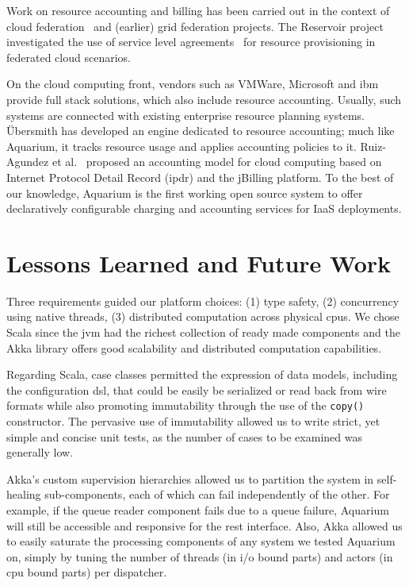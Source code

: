 \documentclass[letterpaper,twocolumn,10pt]{article}
\begin{document}
Work on resource accounting and billing has been carried out in the
context of cloud federation~\cite{Rochw09, Elmro09, Piro06} and
(earlier) grid federation projects. The Reservoir project investigated
the use of service level agreements~\cite{Elmro09} for resource
provisioning in federated cloud scenarios.  

On the cloud computing front, vendors such as VMWare, Microsoft and
{\sc ibm} provide full stack solutions, which also include resource
accounting. Usually, such systems are connected with existing
enterprise resource planning systems. \"Ubersmith has developed an
engine dedicated to resource accounting; much like Aquarium, it tracks
resource usage and applies accounting policies to it. Ruiz-Agundez et
al.~\cite{Ruiz-Agundez11} proposed an accounting model for cloud
computing based on Internet Protocol Detail Record ({\sc ipdr}) and
the jBilling platform. To the best of our knowledge, Aquarium is the
first working open source system to offer declaratively configurable
charging and accounting services for IaaS deployments.

\section{Lessons Learned and Future Work}

Three requirements guided our platform choices: (1) type safety, (2)
concurrency using native threads, (3) distributed computation across
physical {\sc cpu}s. We chose Scala since the {\sc jvm} had the
richest collection of ready made components and the Akka library
offers good scalability and distributed computation capabilities.

Regarding Scala, case classes permitted the expression of data models,
including the configuration {\sc dsl}, that could be easily be
serialized or read back from wire formats while also promoting
immutability through the use of the \texttt{copy()} constructor. The
pervasive use of immutability allowed us to write strict, yet simple
and concise unit tests, as the number of cases to be examined was
generally low.

Akka's custom supervision hierarchies allowed us to partition the
system in self-healing sub-components, each of which can fail
independently of the other. For example, if the queue reader component
fails due to a queue failure, Aquarium will still be accessible and
responsive for the {\sc rest} interface. Also, Akka allowed us to
easily saturate the processing components of any system we tested
Aquarium on, simply by tuning the number of threads (in {\sc i/o}
bound parts) and actors (in {\sc cpu} bound parts) per dispatcher.
\end{document}
